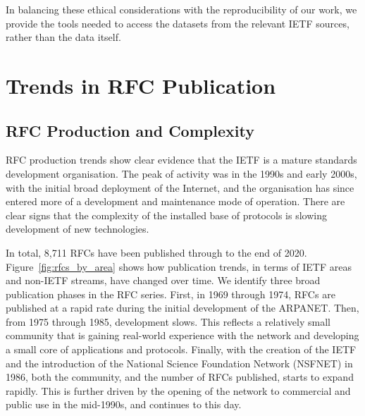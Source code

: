 \documentclass[twocolumn,10pt]{article}
\newcommand{\pb}[1]{\vspace{0.75ex}\noindent{\textbf{#1}}}
\begin{document}
In balancing these ethical considerations with the reproducibility of our
work, we provide the tools needed to access the datasets from the relevant
IETF sources, rather than the data itself.


\section{Trends in RFC Publication}
\label{sec:trends-documents}


\subsection{RFC Production and Complexity}

RFC production trends show clear evidence that the IETF is a mature
standards development organisation. The peak of activity was in the 1990s
and early 2000s, with the initial broad deployment of the Internet, and the
organisation has since entered more of a development and maintenance mode
of operation. There are clear signs that the complexity of the installed
base of protocols is slowing development of new technologies.


\pb{RFC Publication Rate:}
In total, 8,711 RFCs have been published through to the end of 2020.
Figure~\ref{fig:rfcs_by_area} shows how publication trends, in terms of
IETF areas and non-IETF streams, have changed over time. We identify three
broad publication phases in the RFC series. First, in 1969 through 1974,
RFCs are published at a rapid rate during the initial development of the
ARPANET. Then, from 1975 through 1985, development slows. This reflects a
relatively small community that is gaining real-world experience with the
network and developing a small core of applications and protocols. Finally,
with the creation of the IETF and the introduction of the National Science
Foundation Network (NSFNET) in 1986, both the community, and the number of
RFCs published, starts to expand rapidly. This is further driven by the
opening of the network to commercial and public use in the mid-1990s, and
continues to this day.
\end{document}
